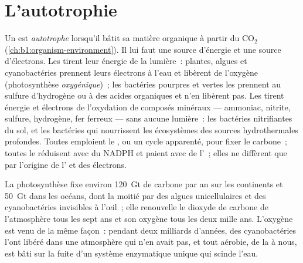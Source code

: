 \section{L'autotrophie}

\begin{definition}[Autotrophie]\label{def:b1:photosynthesis:autotrophy}
Un  est \emph{autotrophe} lorsqu'il bâtit sa
matière organique à partir du $\mathrm{CO_2}$
(\cref{ch:b1:organism-environment}). Il lui faut une source d'énergie et
une source d'électrons. Les \emph{} tirent leur énergie
de la lumière~: plantes, algues et cyanobactéries prennent leurs
électrons à l'eau et libèrent de l'oxygène (photosynthèse
\emph{oxygénique})~; les bactéries pourpres et vertes les prennent au
sulfure d'hydrogène ou à des acides organiques et n'en libèrent pas. Les
\emph{} tirent énergie et électrons de l'oxydation de
composés minéraux --- ammoniac, nitrite, sulfure, hydrogène, fer ferreux
--- sans aucune lumière~: les bactéries nitrifiantes du sol, et les
bactéries qui nourrissent les écosystèmes des sources hydrothermales
profondes. Toutes emploient le , ou un cycle apparenté,
pour fixer le carbone~; toutes le réduisent avec du NADPH et paient avec
de l'~; elles ne diffèrent que par l'origine de l' et des
électrons.
\end{definition}

\begin{example}\label{ex:b1:photosynthesis:global}
La photosynthèse fixe environ \qty{120}{Gt} de carbone par an sur les
continents et \qty{50}{Gt} dans les océans, dont la moitié par des
algues unicellulaires et des cyanobactéries invisibles à l'œil~; elle
renouvelle le dioxyde de carbone de l'atmosphère tous les sept ans et
son oxygène tous les deux mille ans. L'oxygène est venu de la même
façon~: pendant deux milliards d'années, des cyanobactéries l'ont libéré
dans une atmosphère qui n'en avait pas, et tout  aérobie, de la
 à nous, est bâti sur la fuite d'un système enzymatique
unique qui scinde l'eau.
\end{example}

